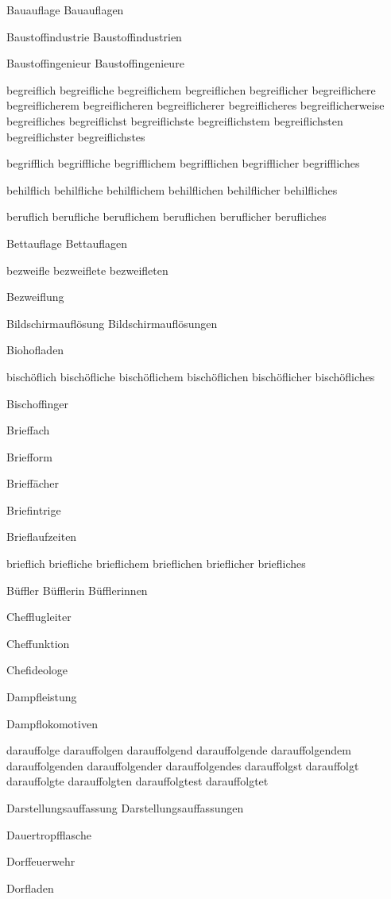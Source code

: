 Bauauflage Bauauflagen

Baustoffindustrie Baustoffindustrien

Baustoffingenieur Baustoffingenieure

begreiflich begreifliche begreiflichem begreiflichen begreiflicher begreiflichere begreiflicherem begreiflicheren begreiflicherer begreiflicheres begreiflicherweise begreifliches begreiflichst begreiflichste begreiflichstem begreiflichsten begreiflichster begreiflichstes

begrifflich begriffliche begrifflichem begrifflichen begrifflicher begriffliches

behilflich behilfliche behilflichem behilflichen behilflicher behilfliches

beruflich berufliche beruflichem beruflichen beruflicher berufliches

Bettauflage Bettauflagen

bezweifle bezweiflete bezweifleten

Bezweiflung

Bildschirmauflösung Bildschirmauflösungen

Biohofladen

bischöflich bischöfliche bischöflichem bischöflichen bischöflicher bischöfliches

Bischoffinger

Brieffach

Briefform

Brieffächer

Briefintrige

Brieflaufzeiten

brieflich briefliche brieflichem brieflichen brieflicher briefliches

Büffler Büfflerin Büfflerinnen

Chefflugleiter

Cheffunktion

Chefideologe

Dampfleistung

Dampflokomotiven

darauffolge darauffolgen darauffolgend darauffolgende darauffolgendem darauffolgenden darauffolgender darauffolgendes darauffolgst darauffolgt darauffolgte darauffolgten darauffolgtest darauffolgtet

Darstellungsauffassung Darstellungsauffassungen

Dauertropfflasche

Dorffeuerwehr

Dorfladen

